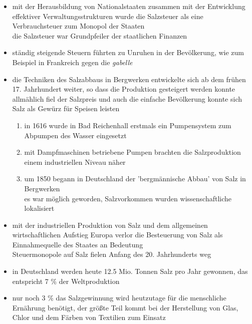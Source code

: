 \documentclass[11pt,a4paper]{article}
\begin{document}
\begin{itemize}

\item mit der Herausbildung von Nationalstaaten zusammen mit der Entwicklung effektiver Verwaltungsstrukturen wurde die Salzsteuer als eine Verbrauchsteuer zum Monopol der Staaten\\
 die Salzsteuer war Grundpfeiler der staatlichen Finanzen

\item ständig steigende Steuern führten zu Unruhen in der Bevölkerung, wie zum Beispiel in Frankreich gegen die \textsl{gabelle}

\item die Techniken des Salzabbaus in Bergwerken entwickelte sich ab dem frühen 17. Jahrhundert weiter, so dass die Produktion gesteigert werden konnte\\
 allmählich fiel der Salzpreis und auch die einfache Bevölkerung konnte sich Salz als Gewürz für Speisen leisten

	\begin{enumerate}
	\item in 1616 wurde in Bad Reichenhall erstmals ein Pumpensystem zum Abpumpen des Wasser eingesetzt
	\item mit Dampfmaschinen betriebene Pumpen brachten die Salzproduktion einem industriellen Niveau näher
	\item um 1850 begann in Deutschland der 'bergmännische Abbau' von Salz in Bergwerken\\
	 es war möglich geworden, Salzvorkommen wurden wissenschaftliche lokalisiert
	\end{enumerate}

\item mit der industriellen Produktion von Salz und dem allgemeinen wirtschaftlichen Aufstieg Europa verlor die Besteuerung von Salz als Einnahmequelle des Staates an Bedeutung\\
 Steuermonopole auf Salz fielen Anfang des 20. Jahrhunderts weg

\item in Deutschland werden heute 12.5 Mio. Tonnen Salz pro Jahr gewonnen, das entspricht 7 \% der Weltproduktion

\item nur noch 3 \% das Salzgewinnung wird heutzutage für die menschliche Ernährung benötigt, der größte Teil kommt bei der Herstellung von Glas, Chlor und dem Färben von Textilien zum Einsatz

\end{itemize}
\end{document}
